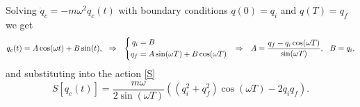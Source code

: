 Solving $\ddot{q}_c = - m \omega^2 q_c(t)$ with boundary conditions $q(0) = q_i$ and $q(T) = q_f$ we get
\begin{equation*}
	q_c(t) = A \cos (\omega t) + B \sin (t),
	\hspace{0.25cm} \Rightarrow \hspace{0.25cm}
	\left\{\begin{aligned}
	    q_i &= B \\
	    q_f &= A \sin(\omega T) + B \cos(\omega T)
	\end{aligned}\right.
	\hspace{0.25cm} \Rightarrow \hspace{0.25cm}
	A = \frac{q_f - q_i \cos(\omega T)}{\sin(\omega T)},
	\hspace{2.5 mm} 
	B = q_i,
\end{equation*}
and substituting into the action \eqref{S}
\begin{equation*}
	S[q_c(t)] = \frac{m \omega}{2 \sin(\omega T)} \left(
		(q_i^2 +q_f^2) \cos(\omega T) - 2 q_i q_f
	\right).
\end{equation*}